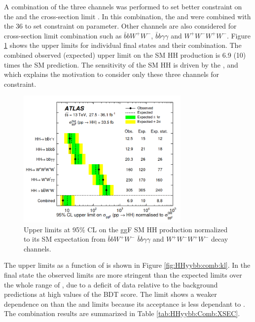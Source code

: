 A combination of the three channels was performed to set better constraint on the \kl and the cross-section limit \cite{HH_Comb_36}. In this combination, the \bbbb and \bbtt were combined with the 36 \ifb \bbyy to set constraint on \kl parameter. Other channels are also considered for cross-section limit combination such as $\bar{b}bW^+W^-$, $\bar{b}b\gamma\gamma$ and $W^+W^-W^+W^-$. Figure \ref{fig:HHyybb:comb:xsec} shows the upper limits for individual final states and their combination. The combined observed (expected) upper limit on the SM HH production is 6.9 (10) times the SM prediction. The sensitivity of the SM HH is driven by the \bbbb, \bbtt and \bbyy which explains the motivation to consider only these three channels for \kl constraint. 
\begin{figure}[htbp]
    \centering
    \includegraphics[width=0.75\textwidth]{Ch1/Img/XSec_Comb_36.png}
    \caption{Upper limits at 95\% CL on the ggF SM HH production normalized to its SM expectation from \bbtt \bbbb \bbyy $\bar{b}bW^+W^-$ $\bar{b}b\gamma\gamma$ and $W^+W^-W^+W^-$ decay channels.}
    \label{fig:HHyybb:comb:xsec}
\end{figure}

The upper limits as a function of \kl is shown in Figure \ref{fig:HHyybb:comb:kl}. In the \bbtt final state the observed limits are more stringent than the expected limits over the whole range of \kl, due to a deficit of data relative to the background predictions at high values of the BDT score. The \bbyy limit shows a weaker dependence on \kl than the \bbbb and \bbtt limits because its acceptance is less dependant to \kl. The combination results are summarized in Table \ref{tab:HHyybb:Comb:XSEC}.

